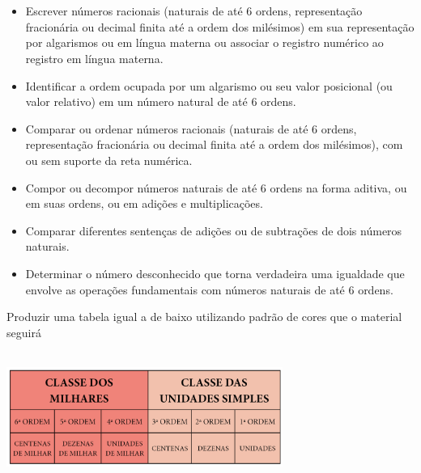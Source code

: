 \pagestyle{mat}
\chapter{}


\begin{itemize}
  \item Escrever números racionais (naturais de até 6 ordens, representação
fracionária ou decimal finita até a ordem dos milésimos) em sua
representação por algarismos ou em língua materna ou associar o registro
numérico ao registro em língua materna.

  \item Identificar a ordem ocupada por um algarismo ou seu valor posicional
(ou valor relativo) em um número natural de até 6 ordens.

  \item Comparar ou ordenar números racionais (naturais de até 6 ordens,
representação fracionária ou decimal finita até a ordem dos milésimos),
com ou sem suporte da reta numérica.

  \item Compor ou decompor números naturais de até 6 ordens na forma aditiva,
ou em suas ordens, ou em adições e multiplicações.

  \item Comparar diferentes sentenças de adições ou de subtrações de dois
números naturais.

  \item Determinar o número desconhecido que torna verdadeira uma igualdade
que envolve as operações fundamentais com números naturais de até 6
ordens.
\end{itemize}



Produzir uma tabela igual a de baixo utilizando padrão de cores que o
material seguirá

\includegraphics[width=3.55128in,height=1.66618in]{media/image1.png}

